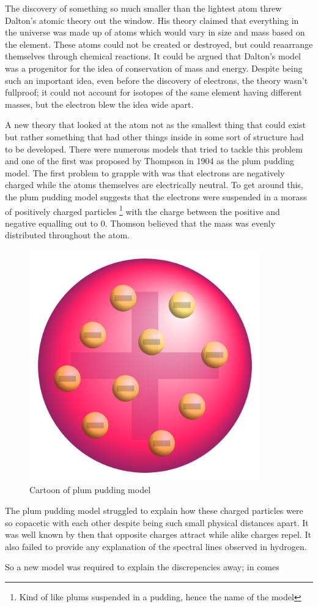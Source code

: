 The discovery of something so much smaller than the lightest atom threw Dalton's atomic theory out the window.
His theory claimed that  everything in the universe was made up of atoms which would vary in size and mass based on the element.
These atoms could not be created or destroyed, but  could reaarrange themselves through chemical reactions.
It could be argued that Dalton's model was a progenitor for the idea of conservation of mass and energy.
Despite being such an important idea, even before the discovery of electrons, the theory wasn't fullproof; it could not account for isotopes of the same element having different masses, but the electron blew the idea wide apart.

A new theory that looked at the atom not as the smallest thing that could exist but rather something that had other things inside in some sort of structure had to be developed.
There were numerous models that tried to tackle this problem and one of the first was proposed by Thompson in 1904 as the plum pudding model.
The first problem to grapple with was that electrons are negatively charged while the atoms themselves are electrically neutral.
To get around this, the plum pudding model suggests that  the electrons were suspended in a morass of positively charged particles
\footnote{Kind of like plums suspended in a pudding, hence the name of the model}
with the charge between the positive  and negative equalling out to 0.
Thomson believed that the mass was evenly distributed throughout the atom.

\begin{figure}[H]
  \centering
  \includegraphics[width=100mm]{figures/plumPudding.png}
  \caption{Cartoon of plum pudding model}
  \label{plumPudding}
\end{figure}

The plum pudding model struggled to explain how these charged particles were so copacetic with each other despite being such small physical distances apart.
It was well known by then that opposite charges attract while alike charges repel.
It also failed to provide any explanation of the spectral lines observed in hydrogen.

So a new model was required to explain the discrepencies away; in comes 



